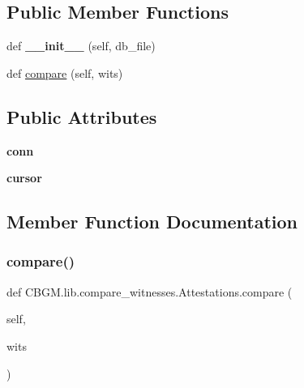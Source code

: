 \subsection*{Public Member Functions}
\begin{DoxyCompactItemize}
\item 
\mbox{\label{classCBGM_1_1lib_1_1compare__witnesses_1_1Attestations_a7f2a79d2f76506e6e5b597bdaf7ca198}} 
def {\bfseries \+\_\+\+\_\+init\+\_\+\+\_\+} (self, db\+\_\+file)
\item 
def \hyperlink{classCBGM_1_1lib_1_1compare__witnesses_1_1Attestations_a98d5c8667a53f75522d2fba7ef19a928}{compare} (self, wits)
\end{DoxyCompactItemize}
\subsection*{Public Attributes}
\begin{DoxyCompactItemize}
\item 
\mbox{\label{classCBGM_1_1lib_1_1compare__witnesses_1_1Attestations_ac2a9708ce2afe9a9105b256da6689c15}} 
{\bfseries conn}
\item 
\mbox{\label{classCBGM_1_1lib_1_1compare__witnesses_1_1Attestations_a46768ce1b1447a4817a07efdc4372fe0}} 
{\bfseries cursor}
\end{DoxyCompactItemize}


\subsection{Member Function Documentation}
\mbox{\label{classCBGM_1_1lib_1_1compare__witnesses_1_1Attestations_a98d5c8667a53f75522d2fba7ef19a928}} 
\subsubsection{\texorpdfstring{compare()}{compare()}}
{\footnotesize\ttfamily def C\+B\+G\+M.\+lib.\+compare\+\_\+witnesses.\+Attestations.\+compare (\begin{DoxyParamCaption}\item[{}]{self,  }\item[{}]{wits }\end{DoxyParamCaption})}


